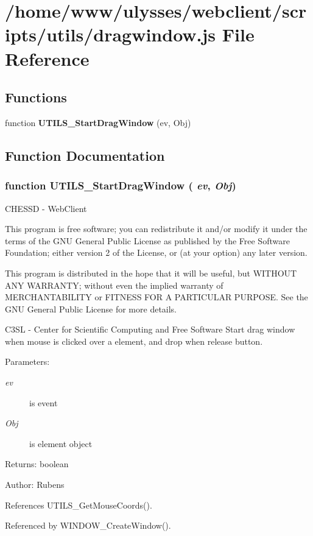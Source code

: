 \section{/home/www/ulysses/webclient/scripts/utils/dragwindow.js File Reference}
\label{dragwindow_8js}
\subsection*{Functions}
\begin{CompactItemize}
\item 
function {\bf UTILS\_\-StartDragWindow} (ev, Obj)
\end{CompactItemize}


\subsection{Function Documentation}
\subsubsection{\setlength{\rightskip}{0pt plus 5cm}function UTILS\_\-StartDragWindow ( {\em ev}, \/   {\em Obj})}\label{dragwindow_8js_936119f257d49c89f33d5e50e71bf48f}


CHESSD - WebClient

This program is free software; you can redistribute it and/or modify it under the terms of the GNU General Public License as published by the Free Software Foundation; either version 2 of the License, or (at your option) any later version.

This program is distributed in the hope that it will be useful, but WITHOUT ANY WARRANTY; without even the implied warranty of MERCHANTABILITY or FITNESS FOR A PARTICULAR PURPOSE. See the GNU General Public License for more details.

C3SL - Center for Scientific Computing and Free Software Start drag window when mouse is clicked over a element, and drop when release button.

\begin{Desc}
\item[Parameters:]
\begin{description}
\item[{\em ev}]is event \item[{\em Obj}]is element object \end{description}
\end{Desc}
\begin{Desc}
\item[Returns:]boolean \end{Desc}
\begin{Desc}
\item[Author:]Rubens \end{Desc}


References UTILS\_\-GetMouseCoords().

Referenced by WINDOW\_\-CreateWindow().